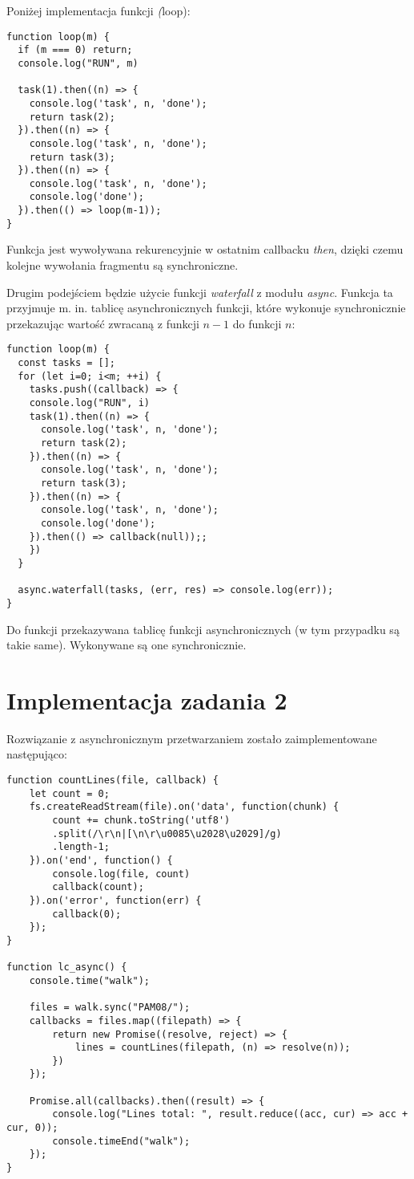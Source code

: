 \documentclass{article}
\begin{document}
Poniżej implementacja funkcji \textit(loop):

\begin{verbatim}
function loop(m) {
  if (m === 0) return;
  console.log("RUN", m)
  
  task(1).then((n) => {
    console.log('task', n, 'done');
    return task(2);
  }).then((n) => {
    console.log('task', n, 'done');
    return task(3);
  }).then((n) => {
    console.log('task', n, 'done');
    console.log('done');
  }).then(() => loop(m-1));
}
\end{verbatim}

Funkcja jest wywoływana rekurencyjnie w ostatnim callbacku \textit{then}, dzięki czemu kolejne wywołania fragmentu są synchroniczne.

Drugim podejściem będzie użycie funkcji \textit{waterfall} z modułu \textit{async}. Funkcja ta przyjmuje m. in. tablicę asynchronicznych
funkcji, które wykonuje synchronicznie przekazując wartość zwracaną z funkcji $n-1$ do funkcji $n$:

\begin{verbatim}
function loop(m) {
  const tasks = [];
  for (let i=0; i<m; ++i) {
    tasks.push((callback) => {
    console.log("RUN", i)
    task(1).then((n) => {
      console.log('task', n, 'done');
      return task(2);
    }).then((n) => {
      console.log('task', n, 'done');
      return task(3);
    }).then((n) => {
      console.log('task', n, 'done');
      console.log('done');
    }).then(() => callback(null));;
    })
  }

  async.waterfall(tasks, (err, res) => console.log(err));
}
\end{verbatim}

Do funkcji przekazywana tablicę funkcji asynchronicznych (w tym przypadku są takie same). Wykonywane są one synchronicznie.

\section{Implementacja zadania 2}

Rozwiązanie z asynchronicznym przetwarzaniem zostało zaimplementowane następująco: 

\begin{verbatim}
function countLines(file, callback) {
    let count = 0;
    fs.createReadStream(file).on('data', function(chunk) {
        count += chunk.toString('utf8')
        .split(/\r\n|[\n\r\u0085\u2028\u2029]/g)
        .length-1;
    }).on('end', function() {
        console.log(file, count)
        callback(count);
    }).on('error', function(err) {
        callback(0);
    });
}

function lc_async() {
    console.time("walk");

    files = walk.sync("PAM08/");
    callbacks = files.map((filepath) => {
        return new Promise((resolve, reject) => {
            lines = countLines(filepath, (n) => resolve(n));
        })
    });

    Promise.all(callbacks).then((result) => {
        console.log("Lines total: ", result.reduce((acc, cur) => acc + cur, 0));
        console.timeEnd("walk");
    });
}
\end{verbatim}
\end{document}
